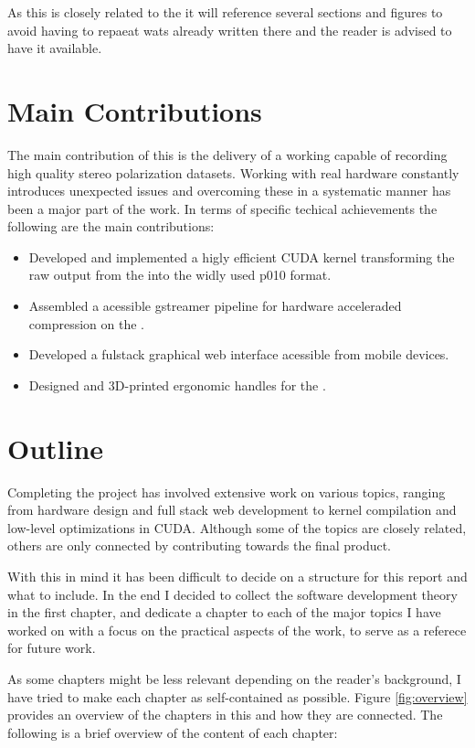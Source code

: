 As this \master is closely related to the \preproject it will reference several sections and figures to avoid having to repaeat wats already written there and the reader is advised to have it available.

\section{Main Contributions}
The main contribution of this \master is the delivery of a working \sr capable of recording high quality stereo polarization datasets.
Working with real hardware constantly introduces unexpected issues and overcoming these in a systematic manner has been a major part of the work.
In terms of specific techical achievements the following are the main contributions:

\begin{itemize}
    \item Developed and implemented a higly efficient CUDA kernel transforming the raw output from the \cams into the widly used \gls{p010} format.
    \item Assembled a \py acessible \gls{gstreamer} pipeline for hardware acceleraded compression on the \jx.
    \item Developed a fulstack graphical web interface acessible from mobile devices.
    \item Designed and 3D-printed ergonomic handles for the \sr.
\end{itemize}


\section{Outline}
Completing the \sr project has involved extensive work on various topics, ranging from hardware design and full stack web development to kernel compilation and low-level optimizations in CUDA.
Although some of the topics are closely related, others are only connected  by contributing towards the final product.

With this in mind it has been difficult to decide on a structure for this report and what to include.
In the end I decided to collect the software development theory in the first chapter, and dedicate a chapter to each of the major topics I have worked on with a focus on the practical aspects of the work, to serve as a referece for future work.

As some chapters might be less relevant depending on the reader's background, I have tried to make each chapter as self-contained as possible.
Figure \ref{fig:overview} provides an overview of the chapters in this \master and how they are connected.
The following is a brief overview of the content of each chapter:

